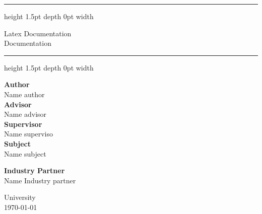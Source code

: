 \newcommand\HRule{\noindent\hrule height 1.5pt depth 0pt width \linewidth \relax}

\begin{titlepage}
\sffamily
{}
\HRule
\vspace{20pt}
\begin{flushright}
    \Huge{Latex Documentation} \\
    \vspace{10pt}
    \Large{Documentation}
\end{flushright}
\vspace{20pt}
\HRule

\begin{flushleft}
    \vspace{70pt}
    \large
    \textbf{Author} \\
    Name author \\
    \textbf{Advisor} \\
    Name advisor \\
    \textbf{Supervisor} \\
    Name superviso \\
    \textbf{Subject} \\
    Name subject

    \vspace{20pt}
    \textbf{Industry Partner} \\
    Name Industry partner
\end{flushleft}

\begin{center}
    University \\
    \today
\end{center}
\end{titlepage}

